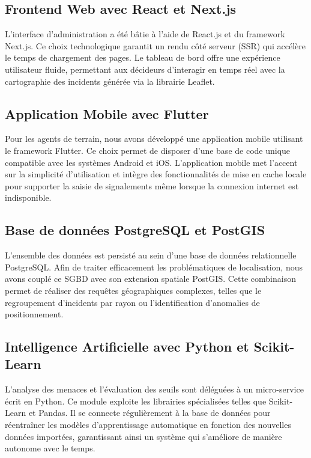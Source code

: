 \documentclass[12pt,a4paper]{article}
\begin{document}
\subsection{Frontend Web avec React et Next.js}
L'interface d'administration a été bâtie à l'aide de React.js et du framework Next.js. Ce choix technologique garantit un rendu côté serveur (SSR) qui accélère le temps de chargement des pages. Le tableau de bord offre une expérience utilisateur fluide, permettant aux décideurs d'interagir en temps réel avec la cartographie des incidents générée via la librairie Leaflet.

\subsection{Application Mobile avec Flutter}
Pour les agents de terrain, nous avons développé une application mobile utilisant le framework Flutter. Ce choix permet de disposer d'une base de code unique compatible avec les systèmes Android et iOS. L'application mobile met l'accent sur la simplicité d'utilisation et intègre des fonctionnalités de mise en cache locale pour supporter la saisie de signalements même lorsque la connexion internet est indisponible.

\subsection{Base de données PostgreSQL et PostGIS}
L'ensemble des données est persisté au sein d'une base de données relationnelle PostgreSQL. Afin de traiter efficacement les problématiques de localisation, nous avons couplé ce SGBD avec son extension spatiale PostGIS. Cette combinaison permet de réaliser des requêtes géographiques complexes, telles que le regroupement d'incidents par rayon ou l'identification d'anomalies de positionnement.

\subsection{Intelligence Artificielle avec Python et Scikit-Learn}
L'analyse des menaces et l'évaluation des seuils sont déléguées à un micro-service écrit en Python. Ce module exploite les librairies spécialisées telles que Scikit-Learn et Pandas. Il se connecte régulièrement à la base de données pour réentraîner les modèles d'apprentissage automatique en fonction des nouvelles données importées, garantissant ainsi un système qui s'améliore de manière autonome avec le temps.
\end{document}
